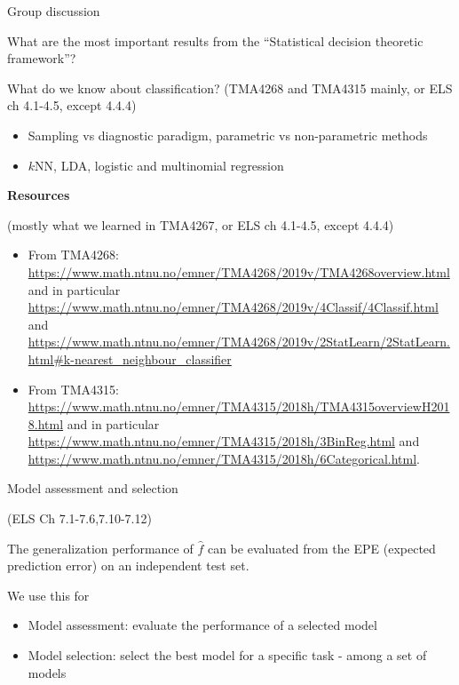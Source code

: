 \documentclass[
  ignorenonframetext,
]{beamer}
\providecommand{\tightlist}{%
  \setlength{\itemsep}{0pt}\setlength{\parskip}{0pt}}
\begin{document}
\begin{frame}

\begin{block}{Group discussion}

What are the most important results from the ``Statistical decision
theoretic framework''?

What do we know about classification? (TMA4268 and TMA4315 mainly, or
ELS ch 4.1-4.5, except 4.4.4)

\begin{itemize}
\tightlist
\item
  Sampling vs diagnostic paradigm, parametric vs non-parametric methods
\item
  \(k\)NN, LDA, logistic and multinomial regression
\end{itemize}

\textbf{Resources}

(mostly what we learned in TMA4267, or ELS ch 4.1-4.5, except 4.4.4)

\begin{itemize}
\tightlist
\item
  From TMA4268:
  \url{https://www.math.ntnu.no/emner/TMA4268/2019v/TMA4268overview.html}
  and in particular
  \url{https://www.math.ntnu.no/emner/TMA4268/2019v/4Classif/4Classif.html}
  and
  \url{https://www.math.ntnu.no/emner/TMA4268/2019v/2StatLearn/2StatLearn.html\#k-nearest_neighbour_classifier}
\item
  From TMA4315:
  \url{https://www.math.ntnu.no/emner/TMA4315/2018h/TMA4315overviewH2018.html}
  and in particular
  \url{https://www.math.ntnu.no/emner/TMA4315/2018h/3BinReg.html} and
  \url{https://www.math.ntnu.no/emner/TMA4315/2018h/6Categorical.html}.
\end{itemize}

\end{block}

\end{frame}

\begin{frame}{Model assessment and selection}
\protect\hypertarget{model-assessment-and-selection}{}

(ELS Ch 7.1-7.6,7.10-7.12)

The generalization performance of \(\hat{f}\) can be evaluated from the
EPE (expected prediction error) on an independent test set.

We use this for

\begin{itemize}
\tightlist
\item
  Model assessment: evaluate the performance of a selected model
\item
  Model selection: select the best model for a specific task - among a
  set of models
\end{itemize}

\end{frame}
\end{document}
